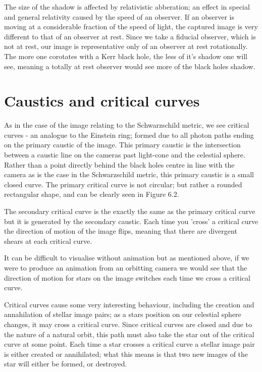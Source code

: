 \documentclass[oneside,openright,frontopenright, singlespacing]{dmathesis}
\begin{document}
\vspace{1em}
	The size of the shadow is affected by relativistic abberation; an effect in special and general relativity caused by the speed of an observer. If an observer is moving at a considerable fraction of the speed of light, the captured image is very different to that of an observer at rest. Since we take a fiducial observer, which is not at rest, our image is representative only of an observer at rest rotationally. The more one corotates with a Kerr black hole, the less of it's shadow one will see, meaning a totally at rest observer would see more of the black holes shadow.


\section{Caustics and critical curves}

\vspace{1em}
	As in the case of the image relating to the Schwarzschild metric, we see critical curves - an analogue to the Einstein ring; formed due to all photon paths ending on the primary caustic of the image. This primary caustic is the intersection between a caustic line on the cameras past light-cone and the celestial sphere. Rather than a point directly behind the black holes centre in line with the camera as is the case in the Schwarzschild metric, this primary caustic is a small closed curve. The primary critical curve is not circular; but rather a rounded rectangular shape, and can be clearly seen in Figure 6.2.

\vspace{1em}
	The secondary critical curve is the exactly the same as the primary critical curve but it is generated by the secondary caustic. Each time you 'cross' a critical curve the direction of motion of the image flips, meaning that there are divergent shears at each critical curve.

\vspace{1em}
	It can be difficult to visualise without animation but as mentioned above, if we were to produce an animation from an orbitting camera we would see that the direction of motion for stars on the image switches each time we cross a critical curve.

\vspace{1em}
	Critical curves cause some very interesting behaviour, including the creation and annahilation of stellar image pairs; as a stars position on our celestial sphere changes, it may cross a critical curve. Since critical curves are closed and due to the nature of a natural orbit, this path must also take the star out of the critical curve at some point. Each time a star crosses a critical curve a stellar image pair is either created or annihilated; what this means is that two new images of the star will either be formed, or destroyed. 
\end{document}
